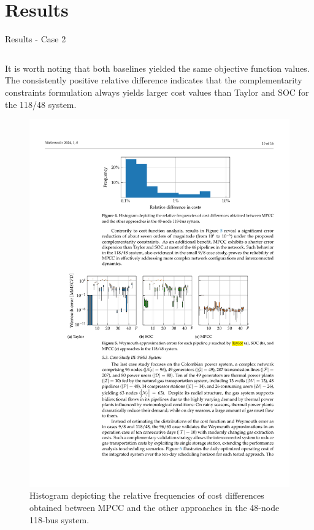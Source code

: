 \documentclass[hyperref={colorlinks,citecolor=blue,linkcolor=blue,urlcolor=blue}]{beamer}
\newlength\figureheight
\newlength\figurewidth
\begin{document}
\section{Results}
\begin{frame}{Results - Case 2}
\scriptsize
\begin{columns}[t,onlytextwidth]
    \begin{column}{0.44\textwidth}
        It is worth noting that both baselines yielded the same objective function values. The consistently positive relative difference indicates that the complementarity constraints formulation always yields larger cost values than Taylor and SOC for the 118/48 system.
        
        
        \begin{figure}[H]
            \centering
            \setlength{}        
            \setlength{}
            \includegraphics[width=\figurewidth, height=\figureheight]{figures/case2_cost.pdf} 
            \caption{\scriptsize Histogram depicting the relative frequencies of cost differences obtained between MPCC and the other approaches in the 48-node 118-bus system.}
            \label{fig:green_test_cost}
        \end{figure}
    \end{column}
    

\end{columns}
\end{frame}
\end{document}
